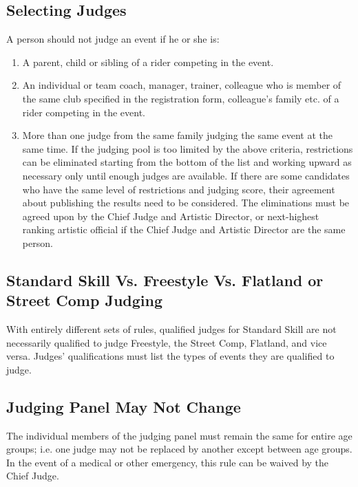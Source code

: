 \subsection{Selecting Judges}
A person should not judge an event if he or she is:
\begin{enumerate}
\item A parent, child or sibling of a rider competing in the event.
\item An individual or team coach, manager, trainer, colleague who is member of the same club specified in the registration form, colleague's family etc. of a rider competing in the event.
\item More than one judge from the same family judging the same event at the same time.
If the judging pool is too limited by the above criteria, restrictions can be eliminated starting from the bottom of the list and working upward as necessary only until enough judges are available.
If there are some candidates who have the same level of restrictions and judging score, their agreement about publishing the results need to be considered.
The eliminations must be agreed upon by the Chief Judge and Artistic Director, or next-highest ranking artistic official if the Chief Judge and Artistic Director are the same person.
\end{enumerate}

\subsection{Standard Skill Vs. Freestyle Vs. Flatland or Street Comp Judging}
With entirely different sets of rules, qualified judges for Standard Skill are not necessarily qualified to judge Freestyle, the Street Comp, Flatland, and vice versa.
Judges' qualifications must list the types of events they are qualified to judge.

\subsection{Judging Panel May Not Change}
The individual members of the judging panel must remain the same for entire age groups; i.e. one judge may not be replaced by another except between age groups.
In the event of a medical or other emergency, this rule can be waived by the Chief Judge.

